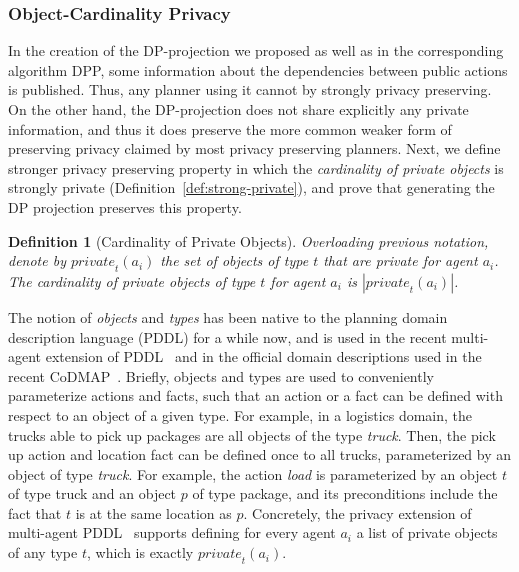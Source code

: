 \documentclass[letterpaper]{article}
\newcommand{\private}[2]{\textit{private}_{#1}(#2)}
\newtheorem{definition}{Definition}
\theoremstyle{definition}
\begin{document}
\subsubsection{Object-Cardinality Privacy}
In the creation of the DP-projection we proposed as well as in the corresponding algorithm DPP, some information about the dependencies between public actions is published. Thus, any planner using it cannot by strongly privacy preserving. On the other hand, the DP-projection does not share explicitly any private information, and thus it does preserve the more common weaker form of preserving privacy claimed by most privacy preserving planners.
Next, we define stronger privacy preserving property in which the {\em cardinality of private objects} is strongly private (Definition~\ref{def:strong-private}), and prove that generating the DP projection preserves this property.

\begin{definition}[Cardinality of Private Objects]
Overloading previous notation, denote by $\private{t}{a_i}$ the set of objects of type $t$ that are private for agent $a_i$. The cardinality of private objects of type $t$ for agent $a_i$ is $|\private{t}{a_i}|$.
\end{definition}

The notion of {\em objects} and {\em types} has been native to the planning domain description language (PDDL) for a while now, and is used in the recent multi-agent extension of PDDL~\cite{kovacs2012multi} and in the official domain descriptions used in the recent CoDMAP~\cite{vstolba2015competition}. Briefly, objects and types are used to conveniently parameterize actions and facts, such that an action or a fact can be defined with respect to an object of a given type. For example, in a logistics domain, the trucks able to pick up packages are all objects of the type {\em truck}. Then, the pick up action and location fact can be defined once to all trucks, parameterized by an object of type {\em truck}. For example, the action {\em load} is parameterized by an object $t$ of type truck and an object $p$ of type package, and its preconditions include the fact that $t$ is at the same location as $p$. %
Concretely, the privacy extension of multi-agent PDDL~\cite{vstolba2015competition} supports defining for every agent $a_i$ a list of private objects of any type $t$, which is exactly $\private{t}{a_i}$.
\end{document}
